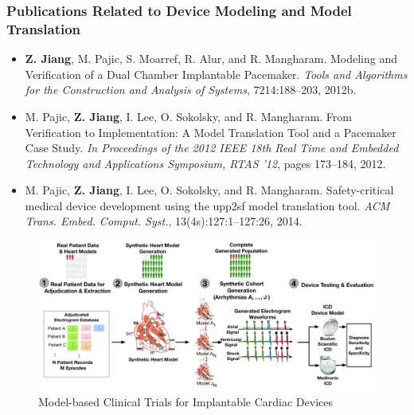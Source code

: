 \documentclass[a4paper,11pt]{article}
\begin{document}
\subsubsection{Publications Related to Device Modeling and Model Translation}
\begin{itemize}
\item \textbf{Z. Jiang}, M. Pajic, S. Moarref, R. Alur, and R. Mangharam. Modeling and Verification of a Dual Chamber Implantable Pacemaker. \emph{Tools and Algorithms for the Construction and Analysis of Systems}, 7214:188–203, 2012b.
\item M. Pajic, \textbf{Z. Jiang}, I. Lee, O. Sokolsky, and R. Mangharam. From Verification to Implementation: A Model Translation Tool and a Pacemaker Case Study. \emph{In Proceedings of the 2012 IEEE 18th Real Time and Embedded Technology and Applications Symposium, RTAS ’12}, pages 173–184, 2012.
\item M. Pajic, \textbf{Z. Jiang}, I. Lee, O. Sokolsky, and R. Mangharam. Safety-critical medical device development using the upp2sf model translation tool. \emph{ACM Trans. Embed. Comput. Syst.}, 13(4s):127:1–127:26, 2014.
\end{itemize}


\begin{figure}[t]
	\centering
	\includegraphics[scale=0.25]{figs/figMBCToverview.pdf}
	\caption{\small Model-based Clinical Trials for Implantable Cardiac Devices}
	\label{fig:mbct}
\end{figure}
\end{document}
